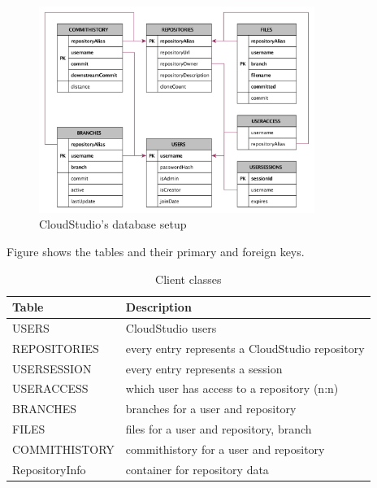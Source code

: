 \begin{figure}[h!]
  \centering
      \includegraphics[width=0.8\textwidth]{databasegraph}
  \caption{CloudStudio's database setup}
  \label{fig:databasegraph}
\end{figure}

Figure \cite{table:databasetables} shows the tables and their primary and foreign keys.


\begin{table}

    \scriptsize
    \begin{tabularx}{\textwidth}{ | l | X | }
    \hline
Table & Description \\ \hline
USERS & CloudStudio users \\ \hline
REPOSITORIES & every entry represents a CloudStudio repository \\ \hline
USERSESSION & every entry represents a session \\ \hline
USERACCESS & which user has access to a repository (n:n) \\ \hline
BRANCHES & branches for a user and repository \\ \hline
FILES & files for a user and repository, branch \\ \hline
COMMITHISTORY & commithistory for a user and repository \\ \hline
RepositoryInfo & container for repository data \\ \hline
    \end{tabularx}
    
    \centering
  \caption{Client classes}
  \label{table:databasetables}
\end{table}



